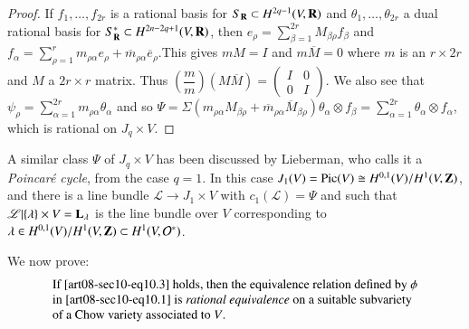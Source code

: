 \begin{proof}
If $f_{1},\ldots,f_{2r}$ is a rational basis for $S_{\mathbf{R}}\subset H^{2q-1}(V,\mathbf{R})$ and $\theta_{1},\ldots,\theta_{2r}$ a dual rational basis for $S^{*}_{\mathbf{R}}\subset H^{2n-2q+1}(V,\mathbf{R})$, then $e_{\rho}=\sum\limits^{2r}_{\beta=1}M_{\beta\rho}f_{\beta}$ and $f_{\alpha}=\sum\limits^{r}_{\rho=1}m_{\rho\alpha}e_{\rho}+\overline{m}_{\rho\alpha}\overline{e}_{\rho}$.\pageoriginale This gives $mM=I$ and $m\overline{M}=0$ where $m$ is an $r\times 2r$ and $M$ a $2r\times r$ matrix. Thus $\left(\dfrac{m}{m}\right)(M\overline{M})=\left(\begin{smallmatrix} I & 0 \\ 0 & I\end{smallmatrix}\right)$. We also see that $\psi_{\rho}=\sum\limits^{2r}_{\alpha=1}m_{\rho\alpha}\theta_{\alpha}$ and so $\Psi=\Sigma(m_{\rho\alpha}M_{\beta\rho}+\overline{m}_{\rho\alpha}\overline{M}_{\beta\rho})\theta_{\alpha}\otimes f_{\beta}=\sum\limits^{2r}_{\alpha=1}\theta_{\alpha}\otimes f_{\alpha}$, which is rational on $J_{q}\times V$.
\end{proof}

\begin{remark*}
A similar class $\Psi$ of $J_{q}\times V$ has been discussed by Lieberman, who calls it a {\em Poincar\'e cycle}, from the case $q=1$. In this case $J_{1}(V)=\operatorname{\mathrm{Pic}}(V)\cong H^{0,1}(V)/H^{1}(V,\mathbf{Z})$, and there is a line bundle $\mathscr{L}\to J_{1}\times V$ with $c_{1}(\mathscr{L})=\Psi$ and such that $\mathscr{L}|\{\lambda\}\times V=\mathbf{L}_{\lambda}$ is the line bundle over $V$ corresponding to $\lambda\in H^{0,1}(V)/H^{1}(V,\mathbf{Z})\subset H^{1}(V,\mathcal{O}^{*})$.
\end{remark*}

We now prove:
\begin{equation}
\begin{array}{l}
\text{If \eqref{art08-sec10-eq10.3} holds, then the equivalence relation defined by $\phi$}\\
\text{in \eqref{art08-sec10-eq10.1} is {\em rational equivalence} on a suitable subvariety}\\
\text{of a Chow variety associated to $V$.}
\end{array}\label{art08-sec10-eq10.10}
\end{equation}

